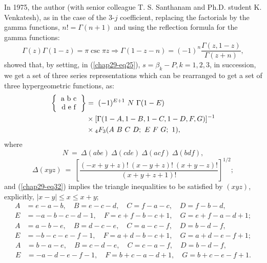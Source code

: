 In 1975, the author (with senior colleague T. S. Santhanam and Ph.D. student 
K. Venkatesh), as in the case of the 3-$j$ coefficient, replacing the factorials by 
the gamma functions, $n! = \Gamma(n+1)$ and using the reflection formula for the gamma 
functions:
\begin{equation}
\Gamma(z)\Gamma(1-z) = \pi \csc \pi z \Rightarrow \Gamma(1-z-n)=(-1)^n \frac{\Gamma(z, 1-z)}{\Gamma(z+n)}, \label{chap29-eq29}
\end{equation}
showed that, by setting, in (\eqref{chap29-eq25}), $s=\beta_k-P, k=1,2,3$, in succession, we get a 
set of three series representations which can be rearranged to get a set of three 
hypergeometric functions, as:
\begin{equation}
\begin{split}
\left\{ 
\begin{tabular} {c} 
a\ b\ c\\ d\ e\ f \\ \end{tabular} 
\right\} 
& =\ (-1)^{E+1}\ N\ \Gamma(1-E)\\
& \times [\Gamma(1-A, 1-B, 1-C, 1-D, F, G)]^{-1}\\
& \times {}_4F_3(A\ B\ C\ D;\ E\ F\ G;\ 1), \label{chap29-eq30}
\end{split}
\end{equation}
where
\begin{equation}
N\ =\ \Delta(abe)\ \Delta(cde)\ \Delta(acf)\ \Delta(bdf), \label{chap29-eq31}
\end{equation}
\begin{equation}
\Delta(xyz)\ =\  \left[ \frac{(-x+y+z)!\ (x-y+z)!\ (x+y-z)!}{(x+y+z+1)!} \right]^{1/2}; \label{chap29-eq32}
\end{equation}
and (\eqref{chap29-eq32}) implies the triangle inequalities to be satisfied by $(xyz)$, explicitly, $|x-y| \leq x \leq x+y$; 
\begin{equation}
\begin{split}
A & = e-a-b, \quad B=e-c-d, \quad C=f-a-c, \quad D=f-b-d,\\
E & = -a-b-c-d-1, \quad F=e+f-b-c+1, \quad G=e+f-a-d+1;\label{chap29-eq33}
\end{split}
\end{equation}
\begin{equation}
\begin{split}
A & = a-b-e, \quad B=d-c-e, \quad C=a-c-f, \quad D=b-d-f,\\
E & = -b-c-e-f-1, \quad F=a+d-b-c+1, \quad G=a+d-e-f+1; \label{chap29-eq34}
\end{split}
\end{equation}
\begin{equation}
\begin{split}
A & = b-a-e, \quad B=c-d-e, \quad C=c-a-f, \quad D=b-d-f,\\
E & = -a-d-e-f-1, \quad F=b+c-a-d+1, \quad G=b+c-e-f+1. \label{chap29-eq35}
\end{split}
\end{equation}

